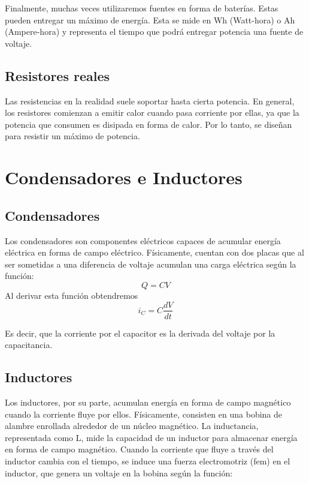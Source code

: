 \begin{example}
{    Finalmente, muchas veces utilizaremos fuentes en forma de baterías. Estas pueden entregar un máximo de energía. Esta se mide en Wh (Watt-hora) o Ah (Ampere-hora) y representa el tiempo que podrá entregar potencia una fuente de voltaje.
    }

    \subsection{Resistores reales}

    Las resistencias en la realidad suele soportar hasta cierta potencia. En general, los resistores comienzan a emitir calor cuando pasa corriente por ellas, ya que la potencia que consumen es disipada en forma de calor. Por lo tanto, se diseñan para resistir un máximo de potencia.

    \newpage


    \section{Condensadores e Inductores}
    \subsection{Condensadores}
    Los condensadores son componentes eléctricos capaces de acumular energía eléctrica en forma de campo eléctrico. Físicamente, cuentan con dos placas que al ser sometidas a una diferencia de voltaje acumulan una carga eléctrica según la función:
    \begin{equation*}
    Q=CV
    \end{equation*}
    Al derivar esta función obtendremos
    \begin{equation*}
    i_C=C\frac{dV}{dt}
    \end{equation*}

    Es decir, que la corriente por el capacitor es la derivada del voltaje por la capacitancia.

    \subsection{Inductores}
    Los inductores, por su parte, acumulan energía en forma de campo magnético cuando la corriente fluye por ellos. Físicamente, consisten en una bobina de alambre enrollada alrededor de un núcleo magnético. La inductancia, representada como L, mide la capacidad de un inductor para almacenar energía en forma de campo magnético. Cuando la corriente que fluye a través del inductor cambia con el tiempo, se induce una fuerza electromotriz (fem) en el inductor, que genera un voltaje en la bobina según la función:


\end{example}
